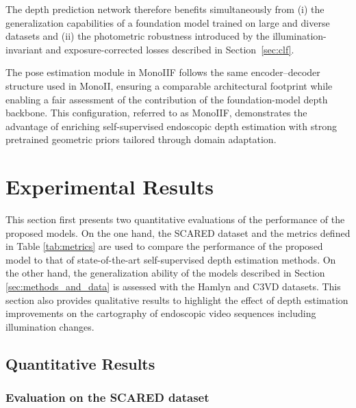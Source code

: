 \documentclass[a4paper,fleqn]{cas-dc}
\begin{document}
%

The depth prediction network therefore benefits simultaneously from (i) the generalization capabilities of a foundation model trained on large and diverse datasets and (ii) the photometric robustness introduced by the illumination-invariant and exposure-corrected losses described in Section~\ref{sec:clf}.
%

The pose estimation module in MonoIIF follows the same encoder–decoder structure used in MonoII, ensuring a comparable architectural footprint while enabling a fair assessment of the contribution of the foundation-model depth backbone. This configuration, referred to as MonoIIF, demonstrates the advantage of enriching self-supervised endoscopic depth estimation with strong pretrained geometric priors tailored through domain adaptation. 

%
\section{Experimental Results \label{sec:Experimental-Results}}
%
This section first presents two quantitative evaluations of the performance of the proposed models. On the one hand, the SCARED dataset and the metrics defined in Table \ref{tab:metrics} are used to compare the performance of the proposed model to that of state-of-the-art self-supervised depth estimation methods. On the other hand, the generalization ability  of the models described in Section \ref{sec:methods_and_data} is assessed with the Hamlyn and C3VD datasets. This section also provides qualitative results to highlight the effect of depth estimation improvements on the cartography of endoscopic video sequences including illumination changes.

\subsection{Quantitative Results \label{sec:quantitative}}
%
\subsubsection{Evaluation on the SCARED dataset\label{sec:Scared_comparison}}
%
\end{document}
